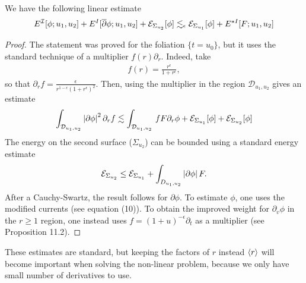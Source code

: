 \documentclass[11pt, oneside]{amsart}
\begin{document}
\begin{lemma}\label{morawetz}
	
	We have the following linear estimate
	\begin{equation*}
		\begin{gathered}
			E^{\mathcal{I}}[\phi;u_1,u_2]+E^{I}[\overline{\partial}\phi;u_1,u_2]+\mathcal{E}_{\Sigma_{u_2}}[\phi]\lesssim_\epsilon \mathcal{E}_{\Sigma_{u_1}}[\phi]+E^{\star I}[F;u_1,u_2]
		\end{gathered}
	\end{equation*}
\end{lemma}
\begin{proof}
	The statement was proved for the foliation $\{t=u_0\}$, but it uses the standard technique of a multiplier $f(r)\partial_r$. Indeed, take
	\begin{equation*}
		\begin{gathered}
			f(r)=\frac{r^\epsilon}{1+r^\epsilon},
		\end{gathered}
	\end{equation*}
	so that $\partial_rf=\frac{\epsilon}{r^{1-\epsilon}(1+r^\epsilon)^2}$. Then, using the multiplier in the region $\mathcal{D}_{u_1,u_2}$ gives an estimate
	\begin{equation*}
		\begin{gathered}
			\int_{\mathcal{D}_{u_1,u_2}}\left\lvert \partial\phi\right\rvert^2\partial_r f\lesssim\int_{\mathcal{D}_{u_1,u_2}}\, f F \partial_r\phi+\mathcal{E}_{\Sigma_{u_1}}[\phi]+\mathcal{E}_{\Sigma_{u_2}}[\phi]
		\end{gathered}
	\end{equation*}
	The energy on the second surface ($\Sigma_{u_2}$) can be bounded using a standard energy estimate
	\begin{equation*}
		\begin{gathered}
			\mathcal{E}_{\Sigma_{u_2}}\leq\mathcal{E}_{\Sigma_{u_1}}+\int_{D_{u_1,u_2}}\left\lvert \partial\phi\right\rvert F.
		\end{gathered}
	\end{equation*}
	After a Cauchy-Swartz, the result follows for $\partial\phi$. 
	To estimate $\phi$, one uses the modified currents (see \cite{yang_global_2013-1} equation (10)). To obtain the improved weight for $\partial_v\phi$ in the $r\geq1$ region, one instead uses $f=(1+u)^{-\epsilon}\partial_t$ as a multiplier (see \cite{luk_introduction_2015} Proposition 11.2).
\end{proof}
\begin{remark}
	These estimates are standard, but keeping the factors of $r$ instead $\langle r \rangle$ will become important when solving the non-linear problem, because we only have small number of derivatives to use.
\end{remark}
\end{document}
